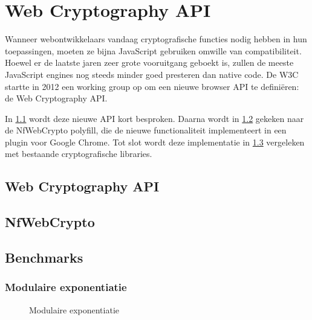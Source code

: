 % 
%

\chapter{Web Cryptography API}
\label{chap:web_cryptography_api}

Wanneer webontwikkelaars vandaag cryptografische functies nodig hebben in hun toepassingen, moeten ze bijna JavaScript gebruiken omwille van compatibiliteit. Hoewel er de laatste jaren zeer grote vooruitgang geboekt is, zullen de meeste JavaScript engines nog steeds minder goed presteren dan native code.\cite{site:resig_javascript_performance_rundown}\cite{site:cois_javascript_performance_rundown_2012}\cite{smedberg_performance_analysis_of_javascript} De W3C startte in 2012 een working group op om een nieuwe browser API te defini\"eren: de Web Cryptography API.\cite{wiki:webcrypto}

\npar In \ref{sec:wc:wb_cryptography_api} wordt deze nieuwe API kort besproken. Daarna wordt in \ref{sec:wc:nfwebcrypto} gekeken naar de NfWebCrypto polyfill, die de nieuwe functionaliteit implementeert in een plugin voor Google Chrome. Tot slot wordt deze implementatie in \ref{sec:wc:benchmarks} vergeleken met bestaande cryptografische libraries.

\section{Web Cryptography API~\cite{sleevi_watson_web_cryptography_api}}
\label{sec:wc:wb_cryptography_api}

\section{NfWebCrypto}
\label{sec:wc:nfwebcrypto}

\section{Benchmarks}
\label{sec:wc:benchmarks}

\subsection{Modulaire exponentiatie}

\begin{figure}
  \caption{Modulaire exponentiatie}
  \label{fig:wc:modular_exponentiation}
\end{figure}

